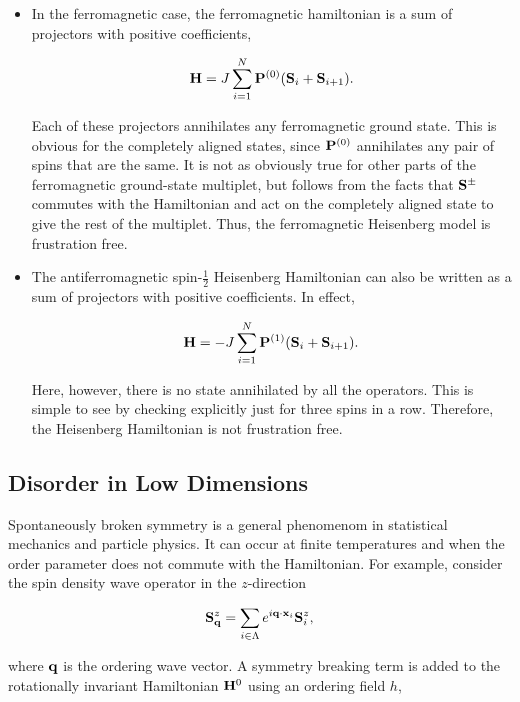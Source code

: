 \documentclass{homework}
\begin{document}
\begin{itemize}
    \item In the ferromagnetic case, 
          the ferromagnetic hamiltonian is a sum of projectors with positive coefficients,
          
          $$
            {\bf H} = J \sum_{i=1}^N {\bf P}^{(0)}({\bf S}_i + {\bf S}_{i+1}).
          $$
          
          Each of these projectors annihilates any ferromagnetic ground state. This is obvious for the completely aligned states, since ${\bf P}^{(0)}$ annihilates any pair of spins that are the same. It is not as obviously true for other parts of the ferromagnetic ground-state multiplet, but follows from the facts that ${\bf S}^\pm$ commutes with the Hamiltonian and act on the completely aligned state to give the rest of the multiplet. Thus, the ferromagnetic Heisenberg model is frustration free. \\
          
          \item The antiferromagnetic spin-$\frac{1}{2}$ Heisenberg Hamiltonian can also be written as a sum of projectors with positive coefficients. In effect, 
          
          $$
            {\bf H} = -J \sum_{i=1}^N {\bf P}^{(1)}({\bf S}_i + {\bf S}_{i+1}).
          $$
          
          Here, however, there is no state annihilated by all the operators. This is simple to see by checking explicitly just for three spins in a row. Therefore, the Heisenberg Hamiltonian is not frustration free. 
\end{itemize}

\clearpage

\subsection{Disorder in Low Dimensions}

Spontaneously broken symmetry is a general phenomenom in statistical mechanics and particle physics. It can occur at finite temperatures and when the order parameter does not commute with the Hamiltonian. For example, consider the spin density wave operator in the $z$-direction

\begin{equation}
    {{\bf S}}_{{\bf q}}^z = \sum_{i \in \Lambda} e^{i {\bf q} \cdot {\bf x}_i } {\bf S}_{i}^z,
\end{equation}

where ${\bf q}$ is the ordering wave vector. A symmetry breaking term is added to the rotationally invariant Hamiltonian ${\bf H}^0$ using an ordering field $h$, 
\end{document}
